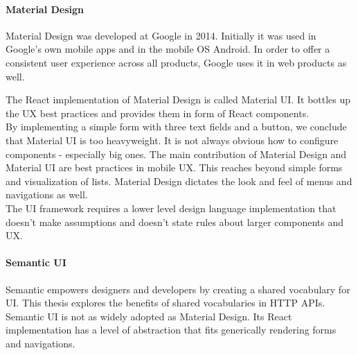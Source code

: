 \paragraph{Material Design}
Material Design was developed at Google in 2014. Initially it was used in Google's own mobile apps and in the mobile OS Android. In order to offer a consistent user experience across all products, Google uses it in web products as well.

The React implementation of Material Design is called Material UI. It bottles up the UX best practices and provides them in form of React components. \\
By implementing a simple form with three text fields and a button, we conclude that Material UI is too heavyweight. It is not always obvious how to configure components - especially big ones. The main contribution of Material Design and Material UI are best practices in mobile UX. This reaches beyond simple forms and visualization of lists. Material Design dictates the look and feel of menus and navigations as well. \\
The UI framework requires a lower level design language implementation that doesn't make assumptions and doesn't state rules about larger components and UX.

\paragraph{Semantic UI}
Semantic empowers designers and developers by creating a shared vocabulary for UI. \citep{semanticui} This thesis explores the benefits of shared vocabularies in HTTP APIs. Semantic UI is not as widely adopted as Material Design. Its React implementation has a level of abstraction that fits generically rendering forms and navigations.

